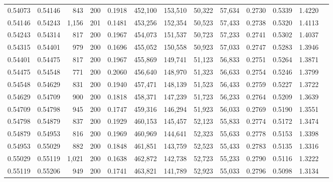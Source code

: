 \begin{tabular}{rrrrrrrrrrrrr}
0.54073 & 0.54146 &   843 & 200 &                                     0.1918 & 452,100 & 153,510 &  50,322 &  57,634 & 0.2730 & 0.5339 & 1.4220 \\
0.54146 & 0.54243 & 1,156 & 201 &                                     0.1481 & 453,256 & 152,354 &  50,523 &  57,433 & 0.2738 & 0.5320 & 1.4113 \\
0.54243 & 0.54314 &   817 & 200 &                                     0.1967 & 454,073 & 151,537 &  50,723 &  57,233 & 0.2741 & 0.5302 & 1.4037 \\
0.54315 & 0.54401 &   979 & 200 &                                     0.1696 & 455,052 & 150,558 &  50,923 &  57,033 & 0.2747 & 0.5283 & 1.3946 \\
0.54401 & 0.54475 &   817 & 200 &                                     0.1967 & 455,869 & 149,741 &  51,123 &  56,833 & 0.2751 & 0.5264 & 1.3871 \\
0.54475 & 0.54548 &   771 & 200 &                                     0.2060 & 456,640 & 148,970 &  51,323 &  56,633 & 0.2754 & 0.5246 & 1.3799 \\
0.54548 & 0.54629 &   831 & 200 &                                     0.1940 & 457,471 & 148,139 &  51,523 &  56,433 & 0.2759 & 0.5227 & 1.3722 \\
0.54629 & 0.54709 &   900 & 200 &                                     0.1818 & 458,371 & 147,239 &  51,723 &  56,233 & 0.2764 & 0.5209 & 1.3639 \\
0.54709 & 0.54798 &   945 & 200 &                                     0.1747 & 459,316 & 146,294 &  51,923 &  56,033 & 0.2769 & 0.5190 & 1.3551 \\
0.54798 & 0.54879 &   837 & 200 &                                     0.1929 & 460,153 & 145,457 &  52,123 &  55,833 & 0.2774 & 0.5172 & 1.3474 \\
0.54879 & 0.54953 &   816 & 200 &                                     0.1969 & 460,969 & 144,641 &  52,323 &  55,633 & 0.2778 & 0.5153 & 1.3398 \\
0.54953 & 0.55029 &   882 & 200 &                                     0.1848 & 461,851 & 143,759 &  52,523 &  55,433 & 0.2783 & 0.5135 & 1.3316 \\
0.55029 & 0.55119 & 1,021 & 200 &                                     0.1638 & 462,872 & 142,738 &  52,723 &  55,233 & 0.2790 & 0.5116 & 1.3222 \\
0.55119 & 0.55206 &   949 & 200 &                                     0.1741 & 463,821 & 141,789 &  52,923 &  55,033 & 0.2796 & 0.5098 & 1.3134 \\

\end{tabular}
